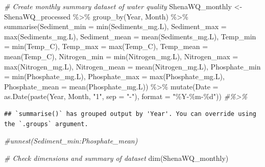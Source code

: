 \documentclass[
  12pt,
]{article}
\newenvironment{Shaded}{\begin{snugshade}}{\end{snugshade}}
\newcommand{\AttributeTok}[1]{\textcolor[rgb]{0.77,0.63,0.00}{#1}}
\newcommand{\CommentTok}[1]{\textcolor[rgb]{0.56,0.35,0.01}{\textit{#1}}}
\newcommand{\FunctionTok}[1]{\textcolor[rgb]{0.00,0.00,0.00}{#1}}
\newcommand{\NormalTok}[1]{#1}
\newcommand{\OtherTok}[1]{\textcolor[rgb]{0.56,0.35,0.01}{#1}}
\newcommand{\SpecialCharTok}[1]{\textcolor[rgb]{0.00,0.00,0.00}{#1}}
\newcommand{\StringTok}[1]{\textcolor[rgb]{0.31,0.60,0.02}{#1}}
\begin{document}
\begin{Shaded}
\begin{Highlighting}[]
\CommentTok{\# Create monthly summary dataset of water quality}
\NormalTok{ShenaWQ\_monthly }\OtherTok{\textless{}{-}}\NormalTok{ ShenaWQ\_processed }\SpecialCharTok{\%\textgreater{}\%}
  \FunctionTok{group\_by}\NormalTok{(Year, Month) }\SpecialCharTok{\%\textgreater{}\%}
  \FunctionTok{summarise}\NormalTok{(}\AttributeTok{Sediment\_min =} \FunctionTok{min}\NormalTok{(Sediments\_mg.L),}
            \AttributeTok{Sediment\_max =} \FunctionTok{max}\NormalTok{(Sediments\_mg.L),}
            \AttributeTok{Sediment\_mean =} \FunctionTok{mean}\NormalTok{(Sediments\_mg.L),}
            \AttributeTok{Temp\_min =} \FunctionTok{min}\NormalTok{(Temp\_C),}
            \AttributeTok{Temp\_max =} \FunctionTok{max}\NormalTok{(Temp\_C),}
            \AttributeTok{Temp\_mean =} \FunctionTok{mean}\NormalTok{(Temp\_C),}
            \AttributeTok{Nitrogen\_min =} \FunctionTok{min}\NormalTok{(Nitrogen\_mg.L),}
            \AttributeTok{Nitrogen\_max =} \FunctionTok{max}\NormalTok{(Nitrogen\_mg.L),}
            \AttributeTok{Nitrogen\_mean =} \FunctionTok{mean}\NormalTok{(Nitrogen\_mg.L),}
            \AttributeTok{Phosphate\_min =} \FunctionTok{min}\NormalTok{(Phosphate\_mg.L),}
            \AttributeTok{Phosphate\_max =} \FunctionTok{max}\NormalTok{(Phosphate\_mg.L),}
            \AttributeTok{Phosphate\_mean =} \FunctionTok{mean}\NormalTok{(Phosphate\_mg.L)) }\SpecialCharTok{\%\textgreater{}\%}
  \FunctionTok{mutate}\NormalTok{(}\AttributeTok{Date =} \FunctionTok{as.Date}\NormalTok{(}\FunctionTok{paste}\NormalTok{(Year, Month, }\StringTok{"1"}\NormalTok{, }\AttributeTok{sep =} \StringTok{"{-}"}\NormalTok{), }\AttributeTok{format =} \StringTok{"\%Y{-}\%m{-}\%d"}\NormalTok{)) }\CommentTok{\#\%\textgreater{}\%}
\end{Highlighting}
\end{Shaded}

\begin{verbatim}
## `summarise()` has grouped output by 'Year'. You can override using the `.groups` argument.
\end{verbatim}

\begin{Shaded}
\begin{Highlighting}[]
  \CommentTok{\#unnest(Sediment\_min:Phosphate\_mean)}

\CommentTok{\# Check dimensions and summary of dataset}
\FunctionTok{dim}\NormalTok{(ShenaWQ\_monthly)}
\end{Highlighting}
\end{Shaded}
\end{document}
